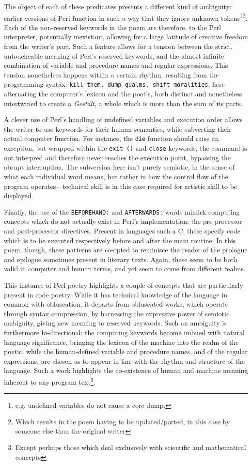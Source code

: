 The object of each of these predicates presents a different kind of ambiguity: earlier versions of Perl function in such a way that they ignore unknown tokens\footnote{e.g. undefined variables do not cause a core dump.}\footnote{Which results in the poem having to be updated/ported, in this case by someone else than the original writer}. Each of the non-reserved keywords in the poem are therefore, to the Perl interpreter, potentially inexistant, allowing for a large latitude of creative freedom from the writer's part. Such a feature allows for a tension between the strict, untoucheable meaning of Perl's reserved keywords, and the almost infinite combination of variable and procedure names and regular expressions. This tension nonetheless happens within a certain rhythm, resulting from the programming syntax: \lstinline{kill them, dump qualms, shift moralities}, here alternating the computer's lexicon and the poet's, both distinct and nonetheless intertwined to create a \emph{Gestalt}, a whole which is more than the sum of its parts.

A clever use of Perl's handling of undefined variables and execution order allows the writer to use keywords for their human semantics, while subverting their actual computer function. For instance, the \lstinline{die} function should raise an exception, but wrapped within the \lstinline{exit ()} and \lstinline{close} keywords, the command is not interpred and therefore never reaches the execution point, bypassing the abrupt interruption. The subversion here isn't purely semiotic, in the sense of what each individual word means, but rather in how the control flow of the program operates—technical skill is in this case required for artistic skill to be displayed.

Finally, the use of the \lstinline{BEFOREHAND:} and \lstinline{AFTERWARDS:} words mimick computing concepts which do not actually exist in Perl's implementation: the pre-processor and post-processor directives. Present in languages such a C, these specify code which is to be executed respectively before and after the main routine. In this poem, though, these patterns are co-opted to reminisce the reader of the prologue and epilogue sometimes present in literary texts. Again, these seem to be both valid in computer and human terms, and yet seem to come from different realms.

This instance of Perl poetry highlights a couple of concepts that are particularly present in code poetry. While it has technical knowledge of the language in common with obfuscation, it departs from obfuscated works, which operate through syntax compression, by harnessing the expressive power of semiotic ambiguity, giving new meaning to reserved keywords. Such an ambiguity is furthermore bi-directional: the computing keywords become imbued with natural language significance, bringing the lexicon of the machine into the realm of the poetic, while the human-defined variable and procedure names, and of the regular expressions, are chosen as to appear in line with the rhythm and structure of the language. Such a work highlights the co-existence of human and machine meaning inherent to any program text\footnote{Except perhaps those which deal exclusively with scientific and mathematical concepts}.

